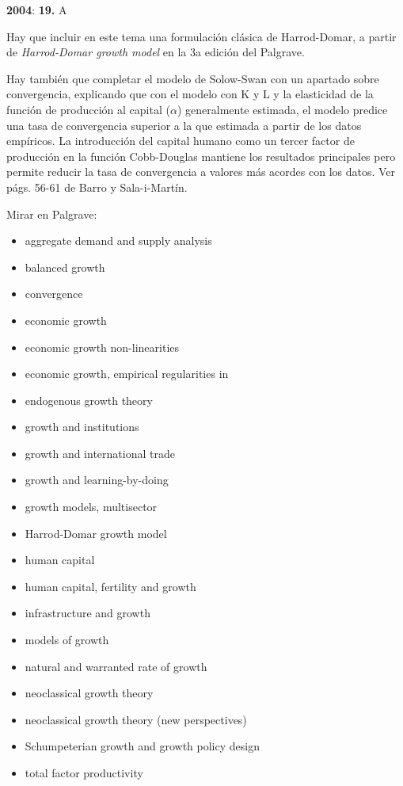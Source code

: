 \documentclass{nuevotema}
\begin{document}
\textbf{2004}: \textbf{19.} A


Hay que incluir en este tema una formulación clásica de Harrod-Domar, a partir de \textit{Harrod-Domar growth model} en la 3a edición del Palgrave.

Hay también que completar el modelo de Solow-Swan con un apartado sobre convergencia, explicando que con el modelo con K y L y la elasticidad de la función de producción al capital ($\alpha$) generalmente estimada, el modelo predice una tasa de convergencia superior a la que estimada a partir de los datos empíricos. La introducción del capital humano como un tercer factor de producción en la función Cobb-Douglas mantiene los resultados principales pero permite reducir la tasa de convergencia a valores más acordes con los datos. Ver págs. 56-61 de Barro y Sala-i-Martín.

\bibliografia

Mirar en Palgrave:
\begin{itemize}
	\item aggregate demand and supply analysis
	\item balanced growth
	\item convergence
	\item economic growth 
	\item economic growth non-linearities
	\item economic growth, empirical regularities in 
	\item endogenous growth theory 
	\item growth and institutions
	\item growth and international trade
	\item growth and learning-by-doing 
	\item growth models, multisector
    \item Harrod-Domar growth model
	\item human capital
	\item human capital, fertility and growth
	\item infrastructure and growth
    \item models of growth
    \item natural and warranted rate of growth
	\item neoclassical growth theory 
	\item neoclassical growth theory (new perspectives) 
	\item Schumpeterian growth and growth policy design 
	\item total factor productivity 	
\end{itemize}
\end{document}
